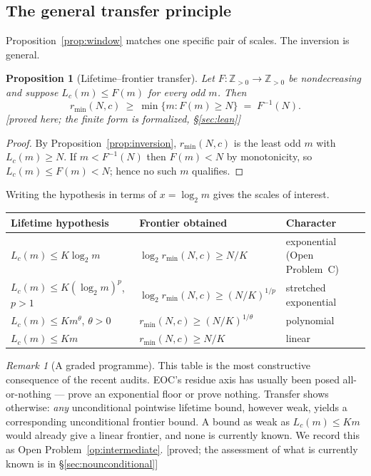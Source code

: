 \documentclass[11pt]{article}
\theoremstyle{plain}
\newtheorem{proposition}[theorem]{Proposition}
\theoremstyle{definition}
\theoremstyle{remark}
\newtheorem{remark}[theorem]{Remark}
\newcommand{\rmin}{r_{\min}}
\newcommand{\status}[1]{\textsf{\footnotesize[#1]}}
\begin{document}
\subsection{The general transfer principle}\label{sec:transfer}

Proposition~\ref{prop:window} matches one specific pair of scales. The inversion is general.

\begin{proposition}[Lifetime--frontier transfer]\label{prop:transfer}
Let $F:\mathbb{Z}_{>0}\to\mathbb{Z}_{>0}$ be nondecreasing and suppose $L_c(m)\le F(m)$ for every
odd $m$. Then
\[
\rmin(N,c)\ \ge\ \min\{m: F(m)\ge N\}\;=\;F^{-1}(N).
\]
\status{proved here; the finite form is formalized, \S\ref{sec:lean}}
\end{proposition}

\begin{proof}
By Proposition~\ref{prop:inversion}, $\rmin(N,c)$ is the least odd $m$ with $L_c(m)\ge N$. If
$m<F^{-1}(N)$ then $F(m)<N$ by monotonicity, so $L_c(m)\le F(m)<N$; hence no such $m$ qualifies.
\end{proof}

Writing the hypothesis in terms of $x=\log_2 m$ gives the scales of interest.

\begin{center}
\begin{tabular}{@{}lll@{}}
\toprule
Lifetime hypothesis & Frontier obtained & Character \\
\midrule
$L_c(m)\le K\log_2 m$ & $\log_2\rmin(N,c)\ge N/K$ & exponential (Open Problem~C) \\
$L_c(m)\le K(\log_2 m)^p$, $p>1$ & $\log_2\rmin(N,c)\ge(N/K)^{1/p}$ & stretched exponential \\
$L_c(m)\le K m^{\theta}$, $\theta>0$ & $\rmin(N,c)\ge(N/K)^{1/\theta}$ & polynomial \\
$L_c(m)\le K m$ & $\rmin(N,c)\ge N/K$ & linear \\
\bottomrule
\end{tabular}
\end{center}

\begin{remark}[A graded programme]\label{rem:graded}
This table is the most constructive consequence of the recent audits. EOC's residue axis has
usually been posed all-or-nothing --- prove an exponential floor or prove nothing. Transfer shows
otherwise: \emph{any} unconditional pointwise lifetime bound, however weak, yields a corresponding
unconditional frontier bound. A bound as weak as $L_c(m)\le Km$ would already give a linear
frontier, and none is currently known. We record this as Open Problem~\ref{op:intermediate}.
\status{proved; the assessment of what is currently known is in \S\ref{sec:nounconditional}}
\end{remark}
\end{document}
